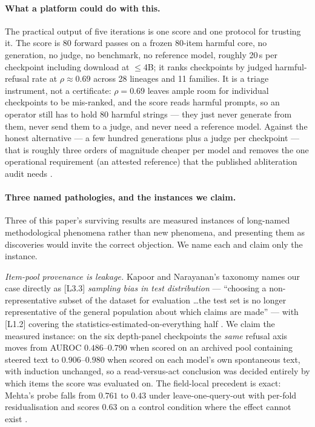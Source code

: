 \documentclass[11pt,letterpaper]{article}
\begin{document}
\paragraph{What a platform could do with this.} The practical output of five iterations is one score and one protocol for trusting it. The score is 80 forward passes on a frozen 80-item harmful core, no generation, no judge, no benchmark, no reference model, roughly 20\,s per checkpoint including download at $\leq$4B; it ranks checkpoints by judged harmful-refusal rate at $\rho \approx 0.69$ across 28 lineages and 11 families. It is a triage instrument, not a certificate: $\rho = 0.69$ leaves ample room for individual checkpoints to be mis-ranked, and the score reads harmful prompts, so an operator still has to hold 80 harmful strings --- they just never generate from them, never send them to a judge, and never need a reference model. Against the honest alternative --- a few hundred generations plus a judge per checkpoint --- that is roughly three orders of magnitude cheaper per model and removes the one operational requirement (an attested reference) that the published abliteration audit needs \citep{Hurtado2026}.

\paragraph{Three named pathologies, and the instances we claim.} Three of this paper's surviving results are measured instances of long-named methodological phenomena rather than new phenomena, and presenting them as discoveries would invite the correct objection. We name each and claim only the instance.

\emph{Item-pool provenance is leakage.} Kapoor and Narayanan's taxonomy names our case directly as [L3.3] \emph{sampling bias in test distribution} --- ``choosing a non-representative subset of the dataset for evaluation \ldots the test set is no longer representative of the general population about which claims are made'' --- with [L1.2] covering the statistics-estimated-on-everything half \citep{Kapoor2023}. We claim the measured instance: on the six depth-panel checkpoints the \emph{same} refusal axis moves from AUROC $0.486$--$0.790$ when scored on an archived pool containing steered text to $0.906$--$0.980$ when scored on each model's own spontaneous text, with induction unchanged, so a read-versus-act conclusion was decided entirely by which items the score was evaluated on. The field-local precedent is exact: Mehta's probe falls from $0.761$ to $0.43$ under leave-one-query-out with per-fold residualisation and scores $0.63$ on a control condition where the effect cannot exist \citep{Mehta2026}.
\end{document}
